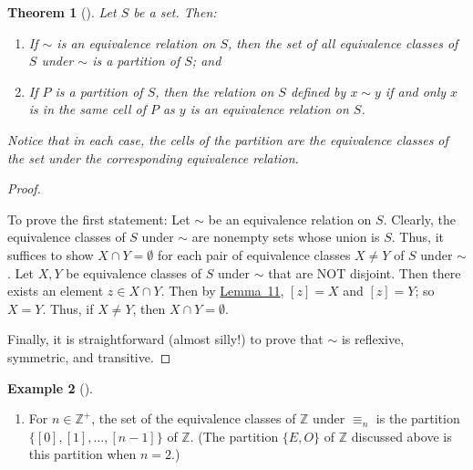 \documentclass[10pt,]{book}
\theoremstyle{plain}
\newtheorem{theorem}{Theorem}[section]
\theoremstyle{definition}
\theoremstyle{definition}
\theoremstyle{definition}
\newtheorem{example}[theorem]{Example}
\theoremstyle{definition}
\numberwithin{equation}{section}
\def\Z{\mathbb{Z}}
\begin{document}
\begin{theorem}[{}]\label{part_quiv}
Let \(S\) be a set. Then: \leavevmode%
\begin{enumerate}
\item\hypertarget{li-408}{}If \(\sim\) is an equivalence relation on \(S\), then the set of all equivalence classes of \(S\) under \(\sim\) is a partition of \(S\); and%
\item\hypertarget{li-409}{}If \(P\) is a partition of \(S\), then the relation on \(S\) defined by \(x\sim y\) if and only \(x\) is in the same cell of \(P\) as \(y\) is an equivalence relation on \(S\).%
\end{enumerate}
%
\par
Notice that in each case, the cells of the partition are the equivalence classes of the set under the corresponding equivalence relation.%
\end{theorem}
\begin{proof}\hypertarget{proof-36}{}
To prove the first statement: Let \(\sim\) be an equivalence relation on \(S\). Clearly, the equivalence classes of \(S\) under \(\sim\) are nonempty sets whose union is \(S\). Thus, it suffices to show \(X
\cap Y =\emptyset\) for each pair of equivalence classes \(X\neq
Y\) of \(S\) under \(\sim\). Let \(X,Y\) be equivalence classes of \(S\) under \(\sim\) that are NOT disjoint. Then there exists an element \(z\in X\cap Y\). Then by \hyperref[vil_lem]{Lemma~11}, \([z]=X\) and \([z]=Y\); so \(X=Y\). Thus, if \(X\neq Y\), then \(X\cap Y
=\emptyset\).%
\par
Finally, it is straightforward (almost silly!) to prove that \(\sim\) is reflexive, symmetric, and transitive.%
\end{proof}
\begin{example}[]\label{example-67}
\leavevmode%
\begin{enumerate}
\item\hypertarget{li-410}{}For \(n\in \Z^+\), the set of the equivalence classes of \(\Z\) under \(\equiv_n\) is the partition \(\{[0],[1],\ldots,[n-1]\}\) of \(\Z\). (The partition \(\{E
,O\}\) of \(\Z\) discussed above is this partition when \(n=2\).)%
\end{enumerate}
\end{example}
\typeout{************************************************}
\typeout{************************************************}
\end{document}
